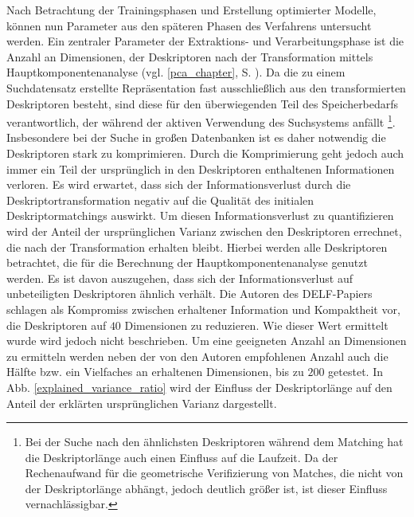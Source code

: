 Nach Betrachtung der Trainingsphasen und Erstellung optimierter Modelle, können nun Parameter aus den späteren Phasen des Verfahrens untersucht werden.
Ein zentraler Parameter der Extraktions- und Verarbeitungsphase ist die Anzahl an Dimensionen, der Deskriptoren nach der Transformation mittels Hauptkomponentenanalyse (vgl. \ref{pca_chapter}, S. \pageref{pca_chapter}). Da die zu einem Suchdatensatz erstellte Repräsentation fast ausschließlich aus den transformierten Deskriptoren besteht, sind diese für den überwiegenden Teil des Speicherbedarfs verantwortlich, der während der aktiven Verwendung des Suchsystems anfällt \footnote{Bei der Suche nach den ähnlichsten Deskriptoren während dem Matching hat die Deskriptorlänge auch einen Einfluss auf die Laufzeit. Da der Rechenaufwand für die geometrische Verifizierung von Matches, die nicht von der Deskriptorlänge abhängt, jedoch deutlich größer ist, ist dieser Einfluss vernachlässigbar.}. Insbesondere bei der Suche in großen Datenbanken ist es daher notwendig die Deskriptoren stark zu komprimieren. Durch die Komprimierung geht jedoch auch immer ein Teil der ursprünglich in den Deskriptoren enthaltenen Informationen verloren. Es wird erwartet, dass sich der Informationsverlust durch die Deskriptortransformation negativ auf die Qualität des initialen Deskriptormatchings auswirkt. Um diesen Informationsverlust zu quantifizieren wird der Anteil der ursprünglichen Varianz zwischen den Deskriptoren errechnet, die nach der Transformation erhalten bleibt. Hierbei werden alle Deskriptoren betrachtet, die für die Berechnung der Hauptkomponentenanalyse genutzt werden. Es ist davon auszugehen, dass sich der Informationsverlust auf unbeteiligten Deskriptoren ähnlich verhält. Die Autoren des DELF-Papiers \cite{delf} schlagen als Kompromiss zwischen erhaltener Information und Kompaktheit vor, die Deskriptoren auf $40$ Dimensionen zu reduzieren. Wie dieser Wert ermittelt wurde wird jedoch nicht beschrieben. Um eine geeigneten Anzahl an Dimensionen zu ermitteln werden neben der von den Autoren empfohlenen Anzahl auch die Hälfte bzw. ein Vielfaches an erhaltenen Dimensionen, bis zu $200$ getestet. In Abb. \ref{explained_variance_ratio} wird der Einfluss der Deskriptorlänge auf den Anteil der erklärten ursprünglichen Varianz dargestellt.
